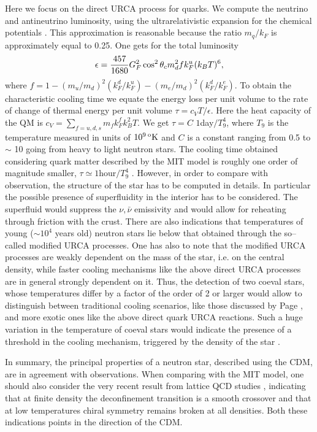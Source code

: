 Here we focus on the direct URCA process for quarks.
We compute the neutrino and antineutrino luminosity, using the
ultrarelativistic expansion for the chemical potentials \cite{iwa}. This
approximation is reasonable
because the ratio $m_q/k_F$ is approximately equal
to 0.25.
One gets for the total luminosity \cite{iwa}
\begin{equation} 
   \epsilon={457\over 1680} G_F^2 \cos^2\theta_c
    m_d^2 f k_F^u (k_B T)^6,
\end{equation}
where $f=1-(m_u/m_d)^2 (k_F^d/k_F^u) - (m_e/m_d)^2 (k_F^d/k_F^e)$.
To obtain the characteristic cooling time we equate the energy loss per
unit volume to the rate of change of thermal energy per unit volume
$\tau=c_V T/\epsilon$. Here
the heat capacity of the QM is $c_V=\sum_{f=u,d,s} m_f k_F^f k_B^2 T$.
We get $\tau=C\,\, 1$day$/T_9^4$, where $T_9$ is the temperature measured in
units of $10^9 \,^{\rm o} {\rm K}$ 
and $C$ is a constant ranging from 0.5 to $\sim$ 10
going from heavy to light neutron stars.
The cooling time obtained considering quark matter described by the
MIT model is roughly one order of magnitude smaller, $\tau\simeq 1$hour$/T_9^4$
\cite{iwa}.
However, in order to compare with observation,
the structure of the star has to be computed in details.
In particular the possible presence of superfluidity
in the interior has to be
considered. The superfluid would suppress the $\nu,\bar{\nu}$ emissivity and
would allow for 
reheating through friction with the crust.
There are also  
indications \cite{umeda,vanriper}
that temperatures of young ($\sim 10^4$ years old) neutron stars lie
below that obtained through the so--called modified  URCA processes.
One has also to note \cite{Page94}
that the modified URCA processes are 
weakly dependent on the mass of the star,
i.e. on the central density, while
faster cooling mechanisms like the above direct
URCA processes are in general strongly
dependent on it. Thus,
the detection of two coeval stars, whose temperatures differ by a factor
of the order of 2 or larger
would allow to distinguish between traditional cooling
scenarios, like those discussed by Page \cite{Page94}, and more exotic
ones like the above direct quark URCA reactions.
Such a huge variation in the
temperature of coeval stars would indicate the presence of a threshold
in the cooling mechanism, triggered by the density of the star \cite{SAX}.

In summary, the principal properties of a neutron star, described using
the CDM, are in agreement with observations. When comparing with the
MIT model, one should also consider the very recent result from 
lattice QCD studies
\cite{lattice}, indicating that at finite density the deconfinement 
transition is a smooth crossover and that at low temperatures chiral
symmetry remains broken at all densities. Both these indications
points in the direction of the CDM.

